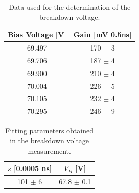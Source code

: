 \documentclass[10pt,a4paper]{article}
\begin{document}
\begin{table}[H]
\centering
\caption{Data used for the determination of the breakdown voltage.}
\begin{tabular}{|c|c|}
\hline 
Bias Voltage [V] & Gain [mV 0.5ns] \\ 
\hline 
69.497 & 170 $\pm$ 3 \\ 
\hline 
69.706 & 187 $\pm$ 4 \\ 
\hline 
69.900 & 210 $\pm$ 4\\ 
\hline 
70.004 & 226 $\pm$ 5\\ 
\hline 
70.105 & 232 $\pm$ 4\\ 
\hline 
70.295 & 246 $\pm$ 9\\ 
\hline 
\end{tabular} 
\label{Table 1}
\end{table}
\begin{table}[H]
\centering
\caption{Fitting parameters obtained in the breakdown voltage measurement.}
\begin{tabular}{|c|c|}
\hline 
 $s$ [0.0005 ns]  & $V_B$ [V] \\ 
\hline 
101 $\pm$ 6 & 67.8 $\pm$ 0.1 \\ 
\hline 
\end{tabular} 
\label{Table 2}
\end{table}
\end{document}

